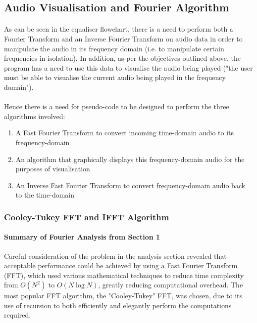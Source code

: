 \pagebreak
\subsection{Audio Visualisation and Fourier Algorithm}

\paragraph{} As can be seen in the equaliser flowchart, there is a need to perform both a Fourier Transform and an Inverse Fourier Transform on audio data in order to manipulate the audio in its frequency domain (i.e. to manipulate certain frequencies in isolation). In addition, as per the objectives outlined above, the program has a need to use this data to visualise the audio being played ("the user must be able to visualise the current audio being played in the frequency domain").

\paragraph{} Hence there is a need for pseudo-code to be designed to perform the three algorithms involved:
\begin{enumerate}
	\item A Fast Fourier Transform to convert incoming time-domain audio to its frequency-domain
	\item An algorithm that graphically displays this frequency-domain audio for the purposes of visualisation
	\item An Inverse Fast Fourier Transform to convert frequency-domain audio back to the time-domain
\end{enumerate}

\subsubsection{Cooley-Tukey FFT and IFFT Algorithm}

\paragraph{Summary of Fourier Analysis from Section 1}  Careful consideration of the problem in the analysis section revealed that acceptable performance could be achieved by using a Fast Fourier Transform (FFT), which used various mathematical techniques to reduce time complexity from \(O(N^2)\) to \(O(N\log{N})\), greatly reducing computational overhead. The most popular FFT algorithm, the "Cooley-Tukey"  FFT, was chosen, due to its use of recursion to both efficiently  and elegantly perform the computations required.

